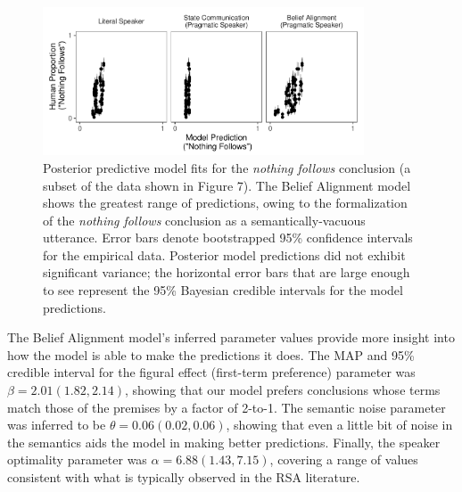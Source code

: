 \documentclass[floatsintext, man]{apa6}
\begin{document}
\begin{figure}[t]
\centering
\includegraphics[width = 0.85\textwidth]{bda_rsa_scatters_0paramPrior_nvc.pdf}
\caption{Posterior predictive model fits for the \emph{nothing follows} conclusion (a subset of the data shown in Figure 7). The Belief Alignment model shows the greatest range of predictions, owing to the formalization of the \emph{nothing follows} conclusion as a semantically-vacuous utterance. Error bars denote bootstrapped 95\% confidence intervals for the empirical data. Posterior model predictions did not exhibit significant variance; the horizontal error bars that are large enough to see represent the 95\% Bayesian credible intervals for the model predictions.}
\label{fig:scatternvc}
\end{figure}


The Belief Alignment model's inferred parameter values provide more insight into how the model is able to make the predictions it does.
The MAP and 95\% credible interval for the figural effect (first-term preference) parameter was  $\beta = 2.01 (1.82, 2.14)$, showing that our model prefers conclusions whose terms match those of the premises by a factor of 2-to-1. 
The semantic noise parameter was inferred to be $\theta = 0.06 (0.02, 0.06)$, showing that even a little bit of noise in the semantics aids the model in making better predictions.
Finally, the speaker optimality parameter was  $\alpha = 6.88 (1.43, 7.15)$, covering a range of values consistent with what is typically observed in the RSA literature. 
\end{document}
